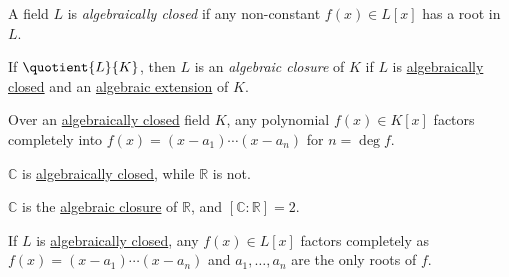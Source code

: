\begin{definition}\label{def:algebraically-closed}
	A field \(L\) is \emph{algebraically closed} if any non-constant \(f(x)\in L[x]\) has a root in \(L\).
\end{definition}

\begin{definition}\label{def:algebraic-closure}
	If \(\quotient{L}{K} \), then \(L\) is an \emph{algebraic closure} of \(K\) if \(L\) is \hyperref[def:algebraically-closed]{algebraically closed} and an \hyperref[def:algebraic-extension]{algebraic extension} of \(K\).
\end{definition}

\begin{remark}
	Over an \hyperref[def:algebraically-closed]{algebraically closed} field \(K\), any polynomial \(f(x) \in K[x]\) factors completely into \(f(x) = (x-a_1) \cdots (x-a_n)\) for \(n = \deg f\).
\end{remark}

\begin{eg}
	\(\mathbb{C} \) is \hyperref[def:algebraically-closed]{algebraically closed}, while \(\mathbb{R} \) is not.
\end{eg}

\begin{eg}
	\(\mathbb{C} \) is the \hyperref[def:algebraically-closed]{algebraic closure} of \(\mathbb{R} \), and \([\mathbb{C} \colon \mathbb{R} ] = 2\).
\end{eg}


If \(L\) is \hyperref[def:algebraically-closed]{algebraically closed}, any \(f(x) \in L[x]\) factors completely as \(f(x) = (x-a_1)\cdots (x-a_n)\) and \(a_1, \dots , a_n\) are the only roots of \(f\).

